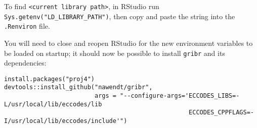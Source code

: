 \documentclass[10pt,fleqn]{article}
\begin{document}
\vspace{12pt}

To find \texttt{<current library path>}, in RStudio run \texttt{Sys.getenv("LD\_LIBRARY\_PATH")}, then copy and paste the string into the \texttt{.Renviron} file. 

You will need to close and reopen RStudio for the new environment variables to be loaded on startup; it should now be possible to install \texttt{gribr} and its dependencies:
\begin{verbatim}
install.packages("proj4")
devtools::install_github("nawendt/gribr", 
                         args = "--configure-args='ECCODES_LIBS=-L/usr/local/lib/eccodes/lib
                                                   ECCODES_CPPFLAGS=-I/usr/local/lib/eccodes/include'")
\end{verbatim}


\newpage
\end{document}
